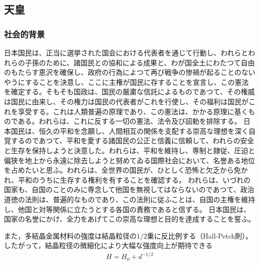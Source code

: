 
\subsection{天皇}
\subsubsection{社会的背景}
日本国民は、正当に選挙された国会における代表者を通じて行動し、われらとわれらの子孫のために、諸国民との協和による成果と、わが国全土にわたつて自由のもたらす恵沢を確保し、政府の行為によつて再び戦争の惨禍が起ることのないやうにすることを決意し、ここに主権が国民に存することを宣言し、この憲法を確定する。そもそも国政は、国民の厳粛な信託によるものであつて、その権威は国民に由来し、その権力は国民の代表者がこれを行使し、その福利は国民がこれを享受する。これは人類普遍の原理であり、この憲法は、かかる原理に基くものである。われらは、これに反する一切の憲法、法令及び詔勅を排除する。
日本国民は、恒久の平和を念願し、人間相互の関係を支配する崇高な理想を深く自覚するのであつて、平和を愛する諸国民の公正と信義に信頼して、われらの安全と生存を保持しようと決意した。われらは、平和を維持し、専制と隷従、圧迫と偏狭を地上から永遠に除去しようと努めてゐる国際社会において、名誉ある地位を占めたいと思ふ。われらは、全世界の国民が、ひとしく恐怖と欠乏から免かれ、平和のうちに生存する権利を有することを確認する。
われらは、いづれの国家も、自国のことのみに専念して他国を無視してはならないのであつて、政治道徳の法則は、普遍的なものであり、この法則に従ふことは、自国の主権を維持し、他国と対等関係に立たうとする各国の責務であると信ずる。
日本国民は、国家の名誉にかけ、全力をあげてこの崇高な理想と目的を達成することを誓ふ。

また，多結晶金属材料の強度は結晶粒径の$1/2$乗に反比例する（Hall-Petch則）。
したがって，結晶粒径の微細化により大幅な強度向上が期待できる~\cite{Watanabe2022}
\begin{align}
    H=H_0+d^{-1/2}
\end{align}

